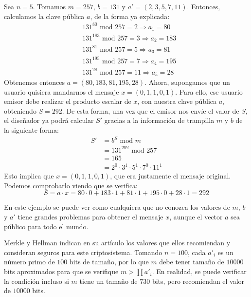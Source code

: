     \newpage
    
    \begin{ejemplo}
        Sea $n = 5$. Tomamos $m = 257$, $b = 131$ y $a' = (2, 3, 5, 7, 11)$. Entonces, calculamos la clave pública $a$, de la forma ya explicada: 
        \begin{align}
            &131^{80} \text{ mod } 257 = 2 \Rightarrow a_{1} = 80 \\
            &131^{183} \text{ mod } 257 = 3 \Rightarrow a_{2} = 183 \\
            &131^{81} \text{ mod } 257 = 5 \Rightarrow a_{3} = 81 \\
            &131^{195} \text{ mod } 257 = 7 \Rightarrow a_{4} = 195 \\
            &131^{28} \text{ mod } 257 = 11 \Rightarrow a_{5} = 28
        \end{align}
        Obtenemos entonces $a = (80, 183, 81, 195, 28)$. Ahora, supongamos que un usuario quisiera mandarnos el mensaje $x = (0, 1, 1, 0, 1)$. Para ello, ese usuario emisor debe realizar el producto escalar de $x$, con nuestra clave pública $a$, obteniendo $S = 292$. De esta forma, una vez que el emisor nos envíe el valor de $S$, el diseñador ya podrá calcular $S'$ gracias a la información de trampilla $m$ y $b$ de la siguiente forma:
        \begin{align}
            S' &= b^{S} \text{ mod } m \\
               &= 131^{292} \text{ mod } 257 \\
               &= 165 \\
               &= 2^{0} \cdot 3^{1} \cdot 5^{1} \cdot 7^{0} \cdot 11^{1} 
        \end{align}
        Esto implica que $x = (0, 1, 1, 0, 1)$, que era justamente el mensaje original. Podemos comprobarlo viendo que se verifica:
        \begin{equation}
            S = a \cdot x = 80 \cdot 0 + 183 \cdot 1 + 81 \cdot 1 + 195 \cdot 0 + 28 \cdot 1 = 292      
        \end{equation}
    \end{ejemplo}

    En este ejemplo se puede ver como cualquiera que no conozca los valores de $m$, $b$ y $a'$ tiene grandes problemas para obtener el mensaje $x$, aunque el vector $a$ sea público para todo el mundo.

    \begin{observacion}
        Merkle y Hellman indican en su artículo \cite{artMH} los valores que ellos recomiendan y consideran seguros para este criptosistema. Tomando $n = 100$, cada $a'_{i}$ es un número primo de $100$ bits de tamaño, por lo que $m$ debe tener tamaño de $10000$ bits aproximados para que se verifique $m > \prod a'_{i}$. En realidad, se puede verificar la condición incluso si $m$ tiene un tamaño de $730$ bits, pero recomiendan el valor de $10000$ bits.
    \end{observacion}


